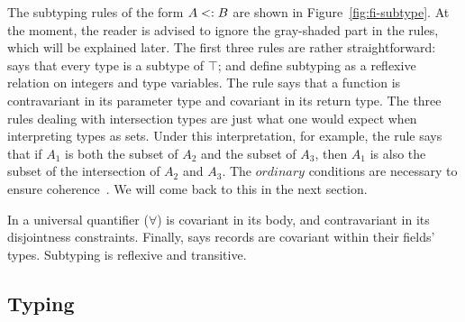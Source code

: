 The subtyping rules of the form $A <: B$ are shown in 
Figure~\ref{fig:fi-subtype}. 
At the moment, the reader is advised to ignore the
gray-shaded part in the rules, which will be explained later. 
The first three rules are rather straightforward: 
says that every type is a subtype of $\top$;  and 
 define subtyping as a reflexive relation on integers and
type variables.
The rule  says that a function is contravariant in 
its parameter type and covariant in its return type. 
The three rules dealing with intersection types are just what one would expect 
when interpreting types as sets. 
Under this interpretation, for example, the rule 
says that if $A_1$ is both the subset of $A_2$ and the subset of $A_3$, then
$A_1$ is also the subset of the intersection of $A_2$ and $A_3$.
The $ordinary$ conditions are necessary to ensure coherence~\cite{icfppaper}.
We will come back to this in the next section.

In  a universal quantifier ($\forall$) 
is covariant in its body, and contravariant in its disjointness constraints.
Finally,  says records are covariant within their fields' types.
Subtyping is reflexive and transitive.


%
%

\subsection{Typing}

